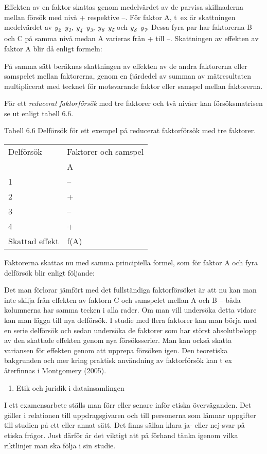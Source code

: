 Effekten av en faktor skattas genom medelvärdet av de parvisa
skillnaderna mellan försök med nivå + respektive --. För faktor A, t~ex
är skattningen medelvärdet av
\emph{y\textsubscript{2}--y\textsubscript{1},
y\textsubscript{4}--y\textsubscript{3},
y\textsubscript{6}--y\textsubscript{5}} och
\emph{y\textsubscript{8}--y\textsubscript{7}}. Dessa fyra par har
faktorerna B och C på samma nivå medan A varieras från + till --.
Skattningen av effekten av faktor A blir då enligt formeln:

På samma sätt beräknas skattningen av effekten av de andra faktorerna
eller samspelet mellan faktorerna, genom en fjärdedel av summan av
mätresultaten multiplicerat med tecknet för motsvarande faktor eller
samspel mellan faktorerna.

För ett \emph{reducerat faktorförsök} med tre faktorer och två nivåer
kan försöksmatrisen se ut enligt tabell 6.6.

Tabell 6.6 Delförsök för ett exempel på reducerat faktorförsök med tre
faktorer.

\begin{longtable}[]{@{}ll@{}}
\toprule
Delförsök & Faktorer och samspel\tabularnewline
& A\tabularnewline
1 & --\tabularnewline
2 & +\tabularnewline
3 & --\tabularnewline
4 & +\tabularnewline
Skattad effekt & f(A)\tabularnewline
\bottomrule
\end{longtable}

Faktorerna skattas nu med samma principiella formel, som för faktor A
och fyra delförsök blir enligt följande:

Det man förlorar jämfört med det fullständiga faktorförsöket är att nu
kan man inte skilja från effekten av faktorn C och samspelet mellan A
och B -- båda kolumnerna har samma tecken i alla rader. Om man vill
undersöka detta vidare kan man lägga till nya delförsök. I studie med
flera faktorer kan man börja med en serie delförsök och sedan undersöka
de faktorer som har störst absolutbelopp av den skattade effekten genom
nya försöksserier. Man kan också skatta variansen för effekten genom att
upprepa försöken igen. Den teoretiska bakgrunden och mer kring praktisk
användning av faktorförsök kan t ex återfinnas i Montgomery (2005).

\begin{enumerate}
\def\labelenumi{\arabic{enumi}.}
\item
  Etik och juridik i datainsamlingen
\end{enumerate}

I ett examensarbete ställs man förr eller senare inför etiska
överväganden. Det gäller i relationen till uppdragsgivaren och till
personerna som lämnar uppgifter till studien på ett eller annat sätt.
Det finns sällan klara ja- eller nej-svar på etiska frågor. Just därför
är det viktigt att på förhand tänka igenom vilka riktlinjer man ska
följa i sin studie.

